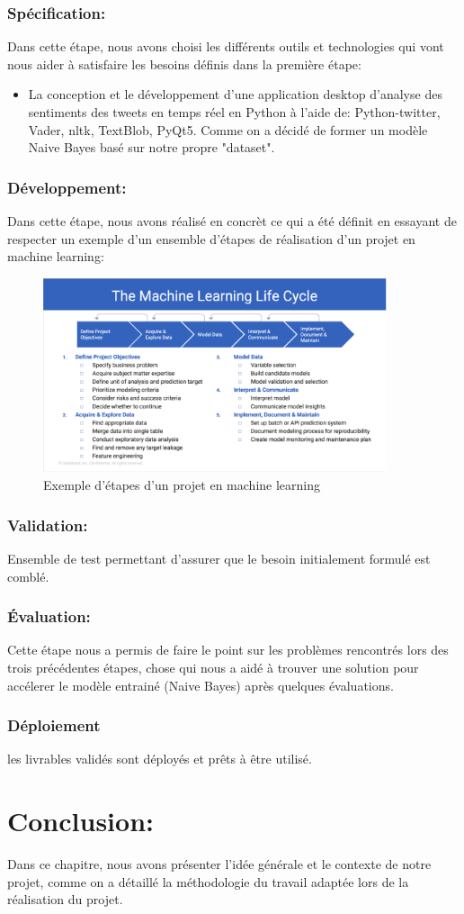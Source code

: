 \subsubsection{Spécification:}
Dans cette étape, nous avons choisi les différents outils et technologies qui vont nous aider à satisfaire les besoins définis dans la première étape: 
\begin{itemize}
    \item La conception et le développement d'une application desktop d'analyse des sentiments des tweets en temps réel en Python à l'aide de: Python-twitter, Vader, nltk, TextBlob, PyQt5. Comme on a décidé de former un modèle Naive Bayes basé sur notre propre "dataset". 
\end{itemize} 
\subsubsection{Développement:}
Dans cette étape, nous avons réalisé en concrèt ce qui a été définit en essayant de respecter un exemple d'un ensemble d'étapes de réalisation d'un projet en machine learning:
\begin{figure}[H]
    \centering
    \includegraphics[width=0.9\textwidth]{contexte-generale/assets/machinelearning.png}
    \caption{Exemple d'étapes d'un projet en machine learning}
    \label{fig:my_label}
\end{figure}
\subsubsection{Validation:}
Ensemble de test permettant d’assurer que le besoin initialement formulé est comblé.
\subsubsection{Évaluation:}
Cette étape nous a permis de faire le point sur les problèmes rencontrés lors des trois précédentes étapes, chose qui nous a aidé à trouver une solution pour accélerer le modèle entrainé (Naive Bayes) après quelques évaluations.
\subsubsection{Déploiement}
les livrables validés sont déployés et prêts à être utilisé.
\section{Conclusion:}
Dans ce chapitre, nous avons présenter l'idée générale et le contexte de notre projet, comme on a détaillé la méthodologie du travail adaptée lors de la réalisation du projet.
